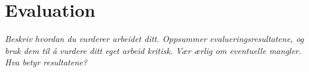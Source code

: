 
\chapter{Evaluation} %

\label{Chapter6}



\emph{Beskriv hvordan du vurderer arbeidet ditt. Oppsummer evalueringsresultatene, og bruk dem til å vurdere ditt eget arbeid kritisk. Vær ærlig om eventuelle mangler. Hva betyr resultatene?}
